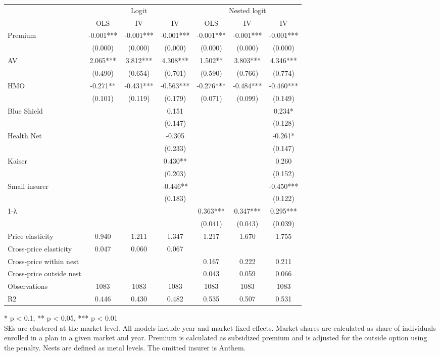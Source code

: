 \setlength{\LTpost}{0mm}
\begin{longtable}{lcccccc}
\toprule
 & \multicolumn{3}{c}{Logit} & \multicolumn{3}{c}{Nested logit} \\ 
\cmidrule(lr){2-4} \cmidrule(lr){5-7}
  & OLS & IV & IV & OLS & IV & IV \\ 
\midrule\addlinespace[2.5pt]
Premium & -0.001*** & -0.001*** & -0.001*** & -0.001*** & -0.001*** & -0.001*** \\ 
 & (0.000) & (0.000) & (0.000) & (0.000) & (0.000) & (0.000) \\ 
AV & 2.065*** & 3.812*** & 4.308*** & 1.502** & 3.803*** & 4.346*** \\ 
 & (0.490) & (0.654) & (0.701) & (0.590) & (0.766) & (0.774) \\ 
HMO & -0.271** & -0.431*** & -0.563*** & -0.276*** & -0.484*** & -0.460*** \\ 
 & (0.101) & (0.119) & (0.179) & (0.071) & (0.099) & (0.149) \\ 
Blue Shield &  &  & 0.151 &  &  & 0.234* \\ 
 &  &  & (0.147) &  &  & (0.128) \\ 
Health Net &  &  & -0.305 &  &  & -0.261* \\ 
 &  &  & (0.233) &  &  & (0.147) \\ 
Kaiser &  &  & 0.430** &  &  & 0.260 \\ 
 &  &  & (0.203) &  &  & (0.152) \\ 
Small insurer &  &  & -0.446** &  &  & -0.450*** \\ 
 &  &  & (0.183) &  &  & (0.122) \\ 
1-λ &  &  &  & 0.363*** & 0.347*** & 0.295*** \\ 
 &  &  &  & (0.041) & (0.043) & (0.039) \\ 
Price elasticity & 0.940 & 1.211 & 1.347 & 1.217 & 1.670 & 1.755 \\ 
Cross-price elasticity & 0.047 & 0.060 & 0.067 &  &  &  \\ 
Cross-price within nest &  &  &  & 0.167 & 0.222 & 0.211 \\ 
Cross-price outside nest &  &  &  & 0.043 & 0.059 & 0.066 \\ 
Observations & 1083 & 1083 & 1083 & 1083 & 1083 & 1083 \\ 
R2 & 0.446 & 0.430 & 0.482 & 0.535 & 0.507 & 0.531 \\ 
\bottomrule
\end{longtable}
\begin{minipage}{\linewidth}
* p < 0.1, ** p < 0.05, *** p < 0.01\\
SEs are clustered at the market level. All models include year and market fixed effects. 
                   Market shares are calculated as share of individuals enrolled in a plan in a given market and year. 
                   Premium is calculated as subsidized premium and is adjusted for the outside option using the penalty. 
                   Nests are defined as metal levels. The omitted insurer is Anthem.\\
\end{minipage}

